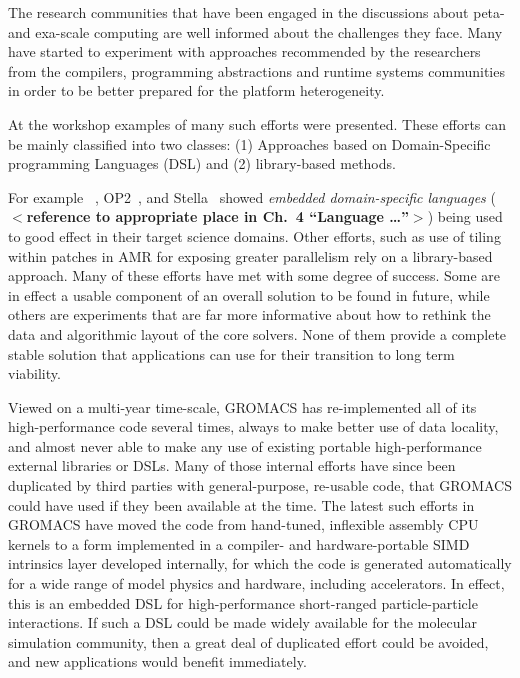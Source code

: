 The research communities that have been engaged in the discussions
about peta- and exa-scale computing are well informed about the
challenges they face.
\textcolor{fhcolor}{Many have started to experiment with approaches
recommended by the researchers from the compilers, programming
abstractions and runtime systems communities in order to be better
prepared for the platform heterogeneity.}

At the workshop examples of many such efforts were presented.
\textcolor{fhcolor}{These efforts can be mainly classified into two
classes: (1) Approaches based on Domain-Specific programming Languages
(DSL) and (2) library-based methods.}

\textcolor{fhcolor}{For example \hipacc~\cite{MHTKE12a}, OP2~\cite{}, and Stella~\cite{} showed
\emph{embedded domain-specific languages} (\textbf{$<$reference to appropriate place in Ch.~4 ``Language \ldots''$>$}) being used to good effect in their target science
domains.}
Other efforts, such as use of tiling within patches in AMR for
exposing greater parallelism rely on a library-based approach.
Many of these efforts
have met with some degree of success. Some are in effect a usable
component of an overall solution to be found in future, while others
are experiments that are far more informative about how to rethink the
data and algorithmic layout of the core solvers. None of them provide
a complete stable solution that applications can use for their
transition to long term viability. 

Viewed on a multi-year time-scale, GROMACS has re-implemented
all of its high-performance code several times, always to make
better use of data locality,\cite{gromacs4,gromacs4.5,gromacs-exascale}
and almost never able to make any use of existing portable high-performance
external libraries or DSLs. Many of those internal efforts have since been
duplicated by third parties with general-purpose, re-usable code,
that GROMACS could have used if they been available at the time.
The latest such efforts in GROMACS have moved the code from
hand-tuned, inflexible assembly CPU kernels to a form implemented
in a compiler- and hardware-portable SIMD intrinsics layer developed
internally, for which the code is generated automatically for a wide
range of model physics and hardware, including accelerators.
In effect, this is an embedded DSL for high-performance short-ranged
particle-particle interactions. If such a DSL could be made widely
available for the molecular simulation community, then a great deal of
duplicated effort could be avoided, and new applications would
benefit immediately.


